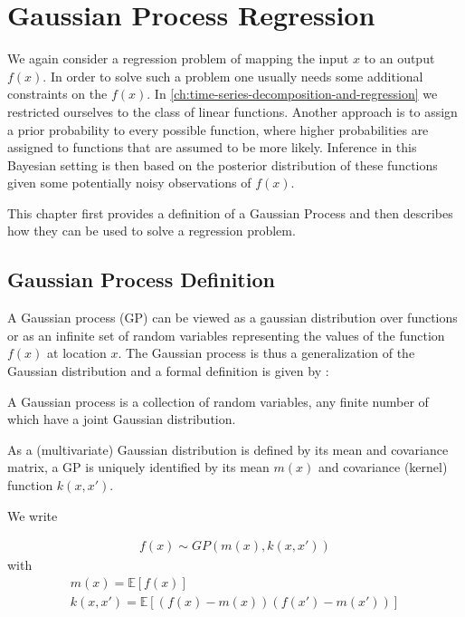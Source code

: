 \chapter{Gaussian Process Regression}\label{ch:gaussian-process-regression}


We again consider a regression problem of mapping the input $x$ to an output $f(x)$.
In order to solve such a problem one usually needs some additional constraints on the $f(x)$.
In \ref{ch:time-series-decomposition-and-regression} we restricted ourselves to the class of linear functions.
Another approach is to assign a prior probability to every possible function, where higher
probabilities are assigned to functions that are assumed to be more likely.
Inference in this Bayesian setting is then based on the posterior distribution of these
functions given some potentially noisy observations of $f(x)$.

This chapter first provides a definition of a Gaussian Process and then describes how they
can be used to solve a regression problem.

\section{Gaussian Process Definition}\label{sec:gaussian-process-definition}

A Gaussian process (GP) can be viewed as a gaussian distribution over functions or as an infinite set of random
variables representing the values of the function $f(x)$ at location $x$.
The Gaussian process is thus a generalization of the Gaussian distribution and a formal definition is given
by \citeauthor{rasmussen_gaussian_2006} :

\begin{definition}\label{def:GP}
 A Gaussian process is a collection of random variables, any finite number of which have a joint Gaussian distribution.
\end{definition}


As a (multivariate) Gaussian distribution is defined by its mean and covariance matrix, a GP is
uniquely identified by its mean $m(x)$ and covariance (kernel) function $k(x,x')$.

We write

\begin{gather*}
    f(x) \sim GP(m(x), k(x,x'))
\end{gather*}
with
\begin{gather*}
    m(x) = \mathbb{E}[f(x)] \\
    k(x,x') = \mathbb{E}[(f(x)-m(x))(f(x')-m(x'))]
\end{gather*}

